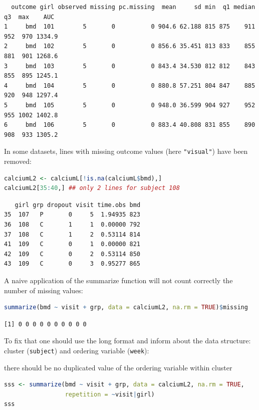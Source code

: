 \documentclass[12pt]{article}
\newcommand\Warning[1][3ex]{%
\renewcommand\stacktype{L}%
\scaleto{\stackon[1.3pt]{\color{red}$\triangle$}{\tiny\bfseries !}}{#1}%
\xspace
}
\begin{document}
\label{}
\begin{verbatim}
  outcome girl observed missing pc.missing  mean     sd min  q1 median  q3  max    AUC
1     bmd  101        5       0          0 904.6 62.188 815 875    911 952  970 1334.9
2     bmd  102        5       0          0 856.6 35.451 813 833    855 881  901 1268.6
3     bmd  103        5       0          0 843.4 34.530 812 812    843 855  895 1245.1
4     bmd  104        5       0          0 880.8 57.251 804 847    885 920  948 1297.4
5     bmd  105        5       0          0 948.0 36.599 904 927    952 955 1002 1402.8
6     bmd  106        5       0          0 883.4 40.808 831 855    890 908  933 1305.2
\end{verbatim}


\noindent \Warning In some datasets, lines with missing outcome values (here \texttt{"visual"})
have been removed:
\begin{lstlisting}[language=r,numbers=none]
calciumL2 <- calciumL[!is.na(calciumL$bmd),]
calciumL2[35:40,] ## only 2 lines for subject 108
\end{lstlisting}

\label{}
\begin{verbatim}
   girl grp dropout visit time.obs bmd
35  107   P       0     5  1.94935 823
36  108   C       1     1  0.00000 792
37  108   C       1     2  0.53114 814
41  109   C       0     1  0.00000 821
42  109   C       0     2  0.53114 850
43  109   C       0     3  0.95277 865
\end{verbatim}


A naive application of the summarize function will not count correctly
the number of missing values:
\begin{lstlisting}[language=r,numbers=none]
summarize(bmd ~ visit + grp, data = calciumL2, na.rm = TRUE)$missing
\end{lstlisting}

\label{}
\begin{verbatim}
[1] 0 0 0 0 0 0 0 0 0 0
\end{verbatim}


\noindent To fix that one should use the long format and inform about
the data structure: cluster (\texttt{subject}) and ordering variable
(\texttt{week}): \newline \Warning there should be no duplicated value of the
ordering variable within cluster
\begin{lstlisting}[language=r,numbers=none]
sss <- summarize(bmd ~ visit + grp, data = calciumL2, na.rm = TRUE,
                 repetition = ~visit|girl)
sss
\end{lstlisting}
\end{document}
